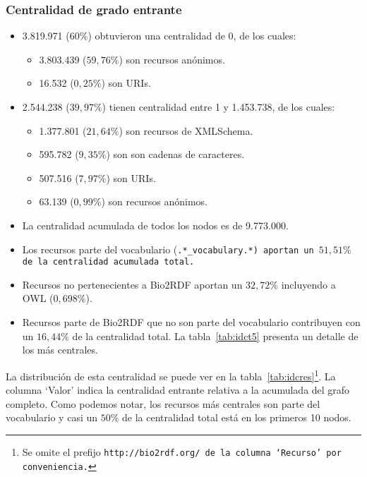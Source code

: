\subsubsection{Centralidad de grado entrante}
\begin{itemize}
  \item 3.819.971 ($60\%$) obtuvieron una centralidad de 0, de los cuales:
    \begin{itemize}
      \item 3.803.439 ($59,76\%$) son recursos anónimos.
      \item 16.532 ($0,25\%$) son URIs.
    \end{itemize}
  \item 2.544.238 ($39,97\%$) tienen centralidad entre 1 y 1.453.738, de los cuales:
    \begin{itemize}
      \item 1.377.801 ($21,64\%$) son recursos de XMLSchema.
      \item 595.782 ($9,35\%$) son son cadenas de caracteres.
      \item 507.516 ($7,97\%$) son URIs.
      \item 63.139 ($0,99\%$) son recursos anónimos.
    \end{itemize}
  \item La centralidad acumulada de todos los nodos es de 9.773.000.
  \item 
    Los recursos parte del vocabulario (\tt{.*\_vocabulary.*}) aportan un 
    $51,51\%$ de la centralidad acumulada total.
  \item
    Recursos no pertenecientes a Bio2RDF aportan un $32,72\%$ incluyendo a OWL 
    ($0,698\%$).
  \item 
    Recursos parte de Bio2RDF que no son parte del vocabulario contribuyen con
    un $16,44\%$ de la centralidad total. La tabla~\ref{tab:idct5} presenta un
    detalle de los más centrales.
\end{itemize}

La distribución de esta centralidad se puede ver en la
tabla~\ref{tab:idcres}\footnote{Se omite el prefijo \tt{http://bio2rdf.org/} de
la columna `Recurso' por conveniencia.}.
La columna `Valor' indica la centralidad entrante relativa a la acumulada del
grafo completo.
Como podemos notar, los recursos más centrales son parte del vocabulario y casi
un $50\%$ de la centralidad total está en los primeros 10 nodos.

